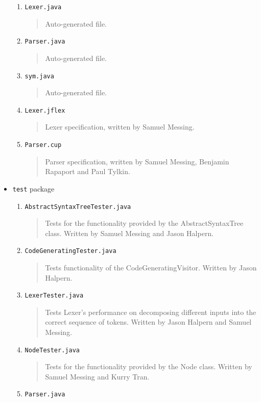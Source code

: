 \documentclass{book}
\begin{document}
\begin{itemize}
\begin{enumerate}
\item \texttt{Lexer.java}
\begin{quotation}
\noindent Auto-generated file.
\end{quotation}
\item \texttt{Parser.java}
\begin{quotation}
\noindent Auto-generated file. 
\end{quotation}
\item \texttt{sym.java}
\begin{quotation}
\noindent Auto-generated file. 
\end{quotation}
\item \texttt{Lexer.jflex}
\begin{quotation}
\noindent Lexer specification, written by Samuel Messing. 
\end{quotation}
\item \texttt{Parser.cup} 
\begin{quotation}
\noindent Parser specification, written by Samuel Messing, Benjamin Rapaport and Paul Tylkin. 
\end{quotation}
\end{enumerate} %
\item \texttt{test} package
\begin{enumerate}
\item \texttt{AbstractSyntaxTreeTester.java}
\begin{quotation}
\noindent Tests for the functionality provided by the AbstractSyntaxTree class. Written by Samuel Messing and Jason Halpern. 
\end{quotation}
\item \texttt{CodeGeneratingTester.java}
\begin{quotation}
\noindent Tests functionality of the CodeGeneratingVisitor. Written by Jason Halpern. 
\end{quotation}
\item \texttt{LexerTester.java}
\begin{quotation}
\noindent Tests Lexer's performance on decomposing different inputs into the correct
 sequence of tokens. Written by Jason Halpern and Samuel Messing. 
\end{quotation}
\item \texttt{NodeTester.java}
\begin{quotation}
\noindent Tests for the functionality provided by the Node class. Written by Samuel Messing and Kurry Tran. 
\end{quotation}
\item \texttt{Parser.java}

\end{enumerate}
\end{itemize}
\end{document}
